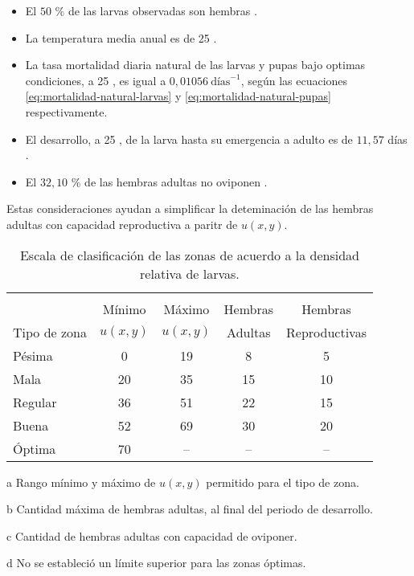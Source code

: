 \begin{itemize}
    \item El $50$ \% de las larvas observadas son hembras \cite{otero2006stochastic, manrique1998desarrollo}.
    \item La temperatura media anual es de 25 \textcelsius \cite{website:mspbsHistoria2014}.
    \item La tasa mortalidad diaria natural de las larvas y pupas bajo optimas condiciones, a 25 \textcelsius, es igual a $0,01056\ \text{días}^{-1}$, según las ecuaciones \eqref{eq:mortalidad-natural-larvas} y \eqref{eq:mortalidad-natural-pupas} respectivamente.
    \item El desarrollo, a 25 \textcelsius, de la larva hasta su emergencia a adulto es de $11,57$ días \cite{rueda1990temperature}.
    \item El $32,10$ \% de las hembras adultas no oviponen \cite{osoriopontificia}.
\end{itemize}

Estas consideraciones ayudan a simplificar la deteminación de las hembras adultas con capacidad
reproductiva a paritr de $u(x,y)$.

\begin{table}[!hptb]
\begin{threeparttable}
    \begin{minipage}[b]{0.5\textwidth}
    \caption{\label{tab:cap4-puntaje-zona} Escala de clasificación de las zonas de acuerdo a la densidad relativa de larvas.}
    \footnotesize
    \begin{tabular}{l c c c c}
        \hline \\
                     & Mínimo\tnote{a} & Máximo\tnote{a} & Hembras     & Hembras \\
        Tipo de zona & $u(x,y)$   & $u(x,y)$   & Adultas\tnote{b} & Reproductivas \tnote{c}\\
        \hline
        \hline
        Pésima  & 0  & 19 & 8  & 5 \\
        Mala    & 20 & 35 & 15 & 10\\
        Regular & 36 & 51 & 22 & 15\\
        Buena   & 52 & 69 & 30 & 20\\
        Óptima  & 70 & --\tnote{d} & --\tnote{d} & --\tnote{d}\\
        \hline
    \end{tabular}
    \begin{tablenotes}[flushleft]\footnotesize
    \item[a]{Rango mínimo y máximo de $u(x,y)$ permitido para el tipo de zona.}
    \item[b]{Cantidad máxima de hembras adultas, al final del periodo de desarrollo.}
    \item[c]{Cantidad de hembras adultas con capacidad de oviponer.}
    \item[d]{No se estableció un límite superior para las zonas óptimas. }
    \end{tablenotes}
    \end{minipage}
    \end{threeparttable}
\end{table}

